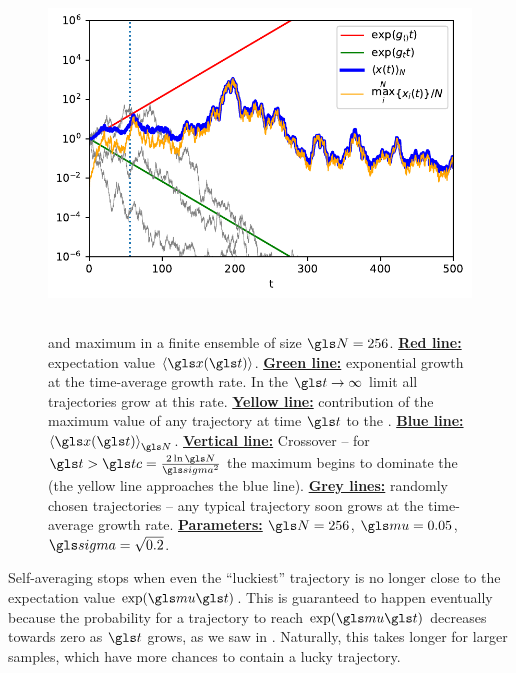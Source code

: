\begin{figure}
\centering
\includegraphics[height=9.3cm]{./chapter_people/figs/trajectories.pdf}
\caption{\PEA and maximum in a finite ensemble of size $\N=256$. {\bf \underline{Red line:}} expectation value $\ave{\x(\t)}$. 
{\bf \underline{Green line:}} exponential growth at the time-average growth rate. In the $\t\to\infty$ limit all trajectories grow at this rate. 
{\bf \underline{Yellow line:}} contribution of the maximum value of any trajectory at time $\t$ to the \PEA.  
{\bf \underline{Blue line:}} \PEA $\ave{\x(\t)}_\N$.
{\bf \underline{Vertical line:}} Crossover -- for $\t>\tc=\frac{2\ln \N}{\gsigma^2}$ the maximum begins to dominate the \PEA (the yellow line approaches the blue line).
{\bf \underline{Grey lines:}} randomly chosen trajectories -- any typical trajectory soon grows at the time-average growth rate.  
{\bf \underline{Parameters:}} $\N=256$, $\gmu=0.05$, $\gsigma=\sqrt{0.2}$.}
\end{figure}
\FloatBarrier

Self-averaging stops when even the ``luckiest'' trajectory is no longer close to the expectation value $\exp(\gmu \t)$. This is guaranteed to happen eventually because the probability for a trajectory to reach $\exp(\gmu \t)$ decreases towards zero as $\t$ grows, as we saw in . Naturally, this takes longer for larger samples, which have more chances to contain a lucky trajectory.

